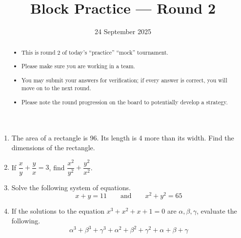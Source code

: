\documentclass{tufte-handout}
\title{Block Practice — Round 2}
\author[IA Math Team]{}
\date{24 September 2025}
\begin{document}
\maketitle

\begin{abstract}
\begin{itemize}
\item This is round $2$ of today's ``practice'' ``mock'' tournament.
\item Please make sure you are working in a team.
\item You may submit your answers for verification; if every answer is correct, you will move on to the next round.
\item Please note the round progression on the board to potentially develop a strategy.
\end{itemize}
\end{abstract}

\vspace{5em}

\begin{enumerate}
    \setlength{\itemsep}{7em}
    \item The area of a rectangle is 96. Its length is 4 more than its width. Find the dimensions of the rectangle. 
    \item If $\dfrac{x}y+\dfrac{y}x=3$, find $\dfrac{x^2}{y^2}+\dfrac{y^2}{x^2}$. 
    \item Solve the following system of equations.
    \[x+y=11\qquad\text{and}\qquad x^2+y^2=65\]
    \item If the solutions to the equation $x^3+x^2+x+1=0$ are $\alpha, \beta, \gamma$, evaluate the following.
    \[
        \alpha^3+\beta^3+\gamma^3+\alpha^2+\beta^2+\gamma^2+\alpha+\beta+\gamma
    \]
\end{enumerate}
\end{document}

